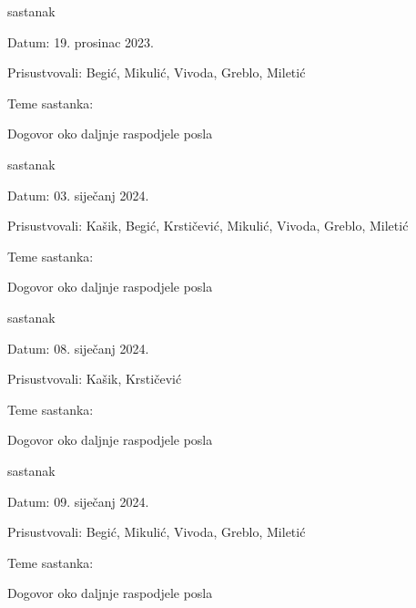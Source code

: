 \begin{packed_enum}
	\item  sastanak
	\item[] \begin{packed_item}
		\item Datum: 19. prosinac 2023.
		\item Prisustvovali: Begić, Mikulić, Vivoda, Greblo, Miletić
		\item Teme sastanka:
		\begin{packed_item}
			\item  Dogovor oko daljnje raspodjele posla
		\end{packed_item}
	\end{packed_item}
	
	\item  sastanak
	\item[] \begin{packed_item}
		\item Datum: 03. siječanj 2024.
		\item Prisustvovali: Kašik, Begić, Krstičević, Mikulić, Vivoda, Greblo, Miletić
		\item Teme sastanka:
		\begin{packed_item}
			\item  Dogovor oko daljnje raspodjele posla
		\end{packed_item}
	\end{packed_item}
	
	\item  sastanak
	\item[] \begin{packed_item}
		\item Datum: 08. siječanj 2024.
		\item Prisustvovali: Kašik, Krstičević
		\item Teme sastanka:
		\begin{packed_item}
			\item  Dogovor oko daljnje raspodjele posla
		\end{packed_item}
	\end{packed_item}
	
	\item  sastanak
	\item[] \begin{packed_item}
		\item Datum: 09. siječanj 2024.
		\item Prisustvovali: Begić, Mikulić, Vivoda, Greblo, Miletić
		\item Teme sastanka:
		\begin{packed_item}
			\item  Dogovor oko daljnje raspodjele posla
		\end{packed_item}
	\end{packed_item}
	

\end{packed_enum}

